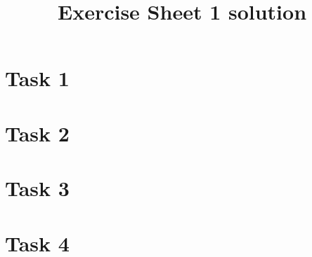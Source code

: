 \documentclass[
	11pt, 
	DIV10,
	a4paper, 
	oneside, 
	headings=normal, 
	captions=tableheading,
	final, 
	numbers=noenddot
]{scrartcl}
\title{Exercise Sheet 1 solution}
\begin{document}
\maketitle
\newpage



\section*{Task 1}

\newpage

\section*{Task 2}
\newpage

\section*{Task 3}

\newpage

\section*{Task 4}

\newpage
\end{document}
